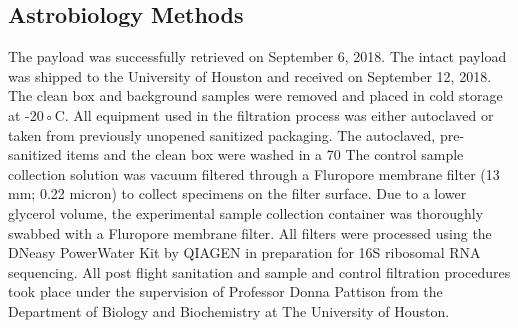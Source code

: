 \subsection{Astrobiology Methods}
\label{sec:Astrobiology Methods}
The payload was successfully retrieved on September 6, 2018. The intact payload was shipped to the University of Houston and received on September 12, 2018. The clean box and background samples were removed and placed in cold storage at -20◦C. All equipment used in the filtration process was either autoclaved or taken from previously unopened sanitized packaging. The autoclaved, pre-sanitized items and the clean box were washed in a 70 %
The control sample collection solution was vacuum filtered through a Fluropore membrane filter (13 mm; 0.22 micron) to collect specimens on the filter surface. Due to a lower glycerol volume, the experimental sample collection container was thoroughly swabbed with a Fluropore membrane filter. All filters were processed using the DNeasy PowerWater Kit by QIAGEN in preparation for 16S ribosomal RNA sequencing. All post flight sanitation and sample and control filtration procedures took place under the supervision of Professor Donna Pattison from the Department of Biology and Biochemistry at The University of Houston.
